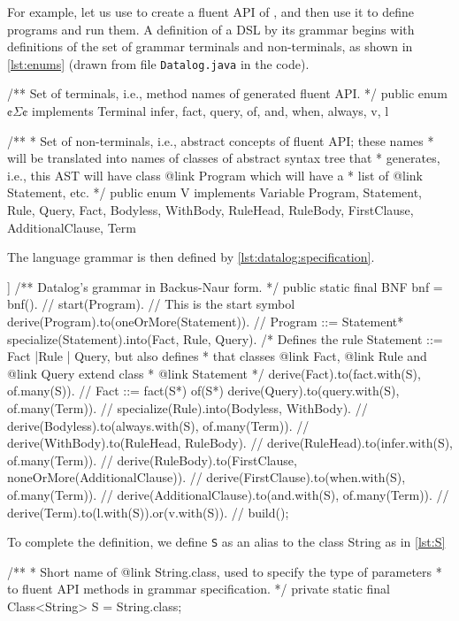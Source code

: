 \documentclass[a4paper,UKenglish,cleveref, autoref]{darts-v2019}
\begin{document}
\begin{scope}
For example, let us use \Fling to create a \Java fluent API of \Datalog, and then
use it to define \Datalog programs and run them.
A definition of a DSL by its grammar begins with definitions of the set of
grammar terminals and non-terminals, as shown in \cref{lst:enums} (drawn from file
\texttt{Datalog.java} in the code).
\begin{excerpt}[language=java,label={lst:enums},caption=
  {Terminals and non-terminals for \Datalog grammar}
]
/** Set of terminals, i.e., method names of generated fluent API. */
public enum ¢$Σ$¢ implements Terminal {
  infer, fact, query, of, and, when, always, v, l
}

/**
* Set of non-terminals, i.e., abstract concepts of fluent API; these names
* will be translated into names of classes of abstract syntax tree that \Fling
* generates, i.e., this AST will have class {@link Program} which will have a
* list of {@link Statement}, etc.
*/
public enum V implements Variable {
  Program, Statement, Rule, Query, Fact, Bodyless, WithBody,
  RuleHead, RuleBody, FirstClause, AdditionalClause, Term
}
\end{excerpt}
The language grammar is then defined by
\cref{lst:datalog:specification}.

\begin{excerpt}[language=java,label={lst:datalog:specification},caption={\Datalog BNF}]]
/** Datalog's grammar in Backus-Naur form. */
public static final BNF bnf = bnf(). //
  start(Program). // This is the start symbol
  derive(Program).to(oneOrMore(Statement)). // Program ::= Statement*
  specialize(Statement).into(Fact, Rule, Query).
  /* Defines the rule Statement ::= Fact |Rule | Query, but also defines
   * that classes {@link Fact}, {@link Rule} and {@link Query} extend class
   * {@link Statement} */
  derive(Fact).to(fact.with(S), of.many(S)). // Fact ::= fact(S*) of(S*)
  derive(Query).to(query.with(S), of.many(Term)). //
  specialize(Rule).into(Bodyless, WithBody). //
  derive(Bodyless).to(always.with(S), of.many(Term)). //
  derive(WithBody).to(RuleHead, RuleBody). //
  derive(RuleHead).to(infer.with(S), of.many(Term)). //
  derive(RuleBody).to(FirstClause, noneOrMore(AdditionalClause)). //
  derive(FirstClause).to(when.with(S), of.many(Term)). //
  derive(AdditionalClause).to(and.with(S), of.many(Term)). //
  derive(Term).to(l.with(S)).or(v.with(S)). //
  build();
\end{excerpt}
To complete the definition, we define \texttt{S} as an alias to
the class String as in \cref{lst:S}
\begin{excerpt}[language=java,label={lst:S},caption=
    {A definition of \texttt{S} is required for \cref{lst:datalog:specification}}
]
/**
 * Short name of {@link String}.class, used to specify the type of parameters
 * to fluent API methods in grammar specification.
 */
private static final Class<String> S = String.class;
\end{excerpt}


\end{scope}
\end{document}
